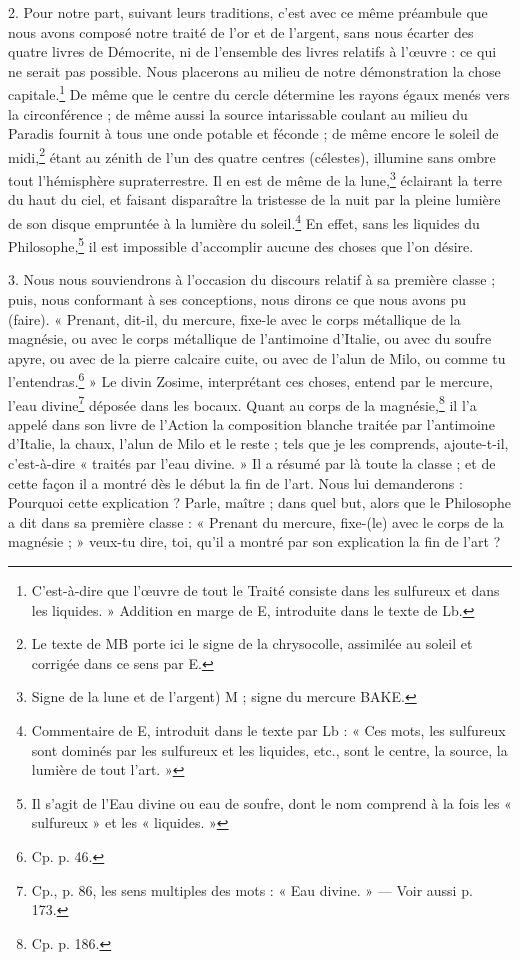 \documentclass[a4paper, 11pt, oneside, polutonikogreek, french]{article}
\begin{document}
2. Pour notre part, suivant leurs traditions, c'est avec ce même préambule que nous avons composé notre traité de l'or et de l'argent, sans nous écarter des quatre livres de Démocrite, ni de l'ensemble des livres relatifs à l'œuvre : ce qui ne serait pas possible. Nous placerons au milieu de notre démonstration la chose capitale.\footnote{C'est-à-dire que l'œuvre de tout le Traité consiste dans les sulfureux et dans les liquides. » Addition en marge de E, introduite dans le texte de Lb.} De même que le centre du cercle détermine les rayons égaux menés vers la circonférence ; de même aussi la source intarissable coulant au milieu du Paradis fournit à tous une onde potable et féconde ; de même encore le soleil de midi,\footnote{Le texte de MB porte ici le signe de la chrysocolle, assimilée au soleil et corrigée dans ce sens par E.} étant au zénith de l'un des quatre centres (célestes), illumine sans ombre tout l'hémisphère supraterrestre. Il en est de même de la lune,\footnote{Signe de la lune et de l'argent) M ; signe du mercure BAKE.} éclairant la terre du haut du ciel, et faisant disparaître la tristesse de la nuit par la pleine lumière de son disque empruntée à la lumière du soleil.\footnote{Commentaire de E, introduit dans le texte par Lb : « Ces mots, les sulfureux sont dominés par les sulfureux et les liquides, etc., sont le centre, la source, la lumière de tout l'art. »} En effet, sans les liquides du Philosophe,\footnote{Il s'agit de l'Eau divine ou eau de soufre, dont le nom comprend à la fois les « sulfureux » et les « liquides. »} il est impossible d'accomplir aucune des choses que l'on désire.

3. Nous nous souviendrons à l'occasion du discours relatif à sa première classe ; puis, nous conformant à ses conceptions, nous dirons ce que nous avons pu (faire). « Prenant, dit-il, du mercure, fixe-le avec le corps métallique de la magnésie, ou avec le corps métallique de l'antimoine d'Italie, ou avec du soufre apyre, ou avec de la pierre calcaire cuite, ou avec de l'alun de Milo, ou comme tu l'entendras.\footnote{Cp. p. 46.} » Le divin Zosime, interprétant ces choses, entend par le mercure, l'eau divine\footnote{Cp., p. 86, les sens multiples des mots : « Eau divine. » --- Voir aussi p. 173.} déposée dans les bocaux. Quant au corps de la magnésie,\footnote{Cp. p. 186.} il l'a appelé dans son livre de l'Action la composition blanche traitée par l'antimoine d'Italie, la chaux, l'alun de Milo et le reste ; tels que je les comprends, ajoute-t-il, c'est-à-dire « traités par l'eau divine. » Il a résumé par là toute la classe ; et de cette façon il a montré dès le début la fin de l'art. Nous lui demanderons : Pourquoi cette explication ? Parle, maître ; dans quel but, alors que le Philosophe a dit dans sa première classe : « Prenant du mercure, fixe-(le) avec le corps de la magnésie ; » veux-tu dire, toi, qu'il a montré par son explication la fin de l'art ?
\end{document}
